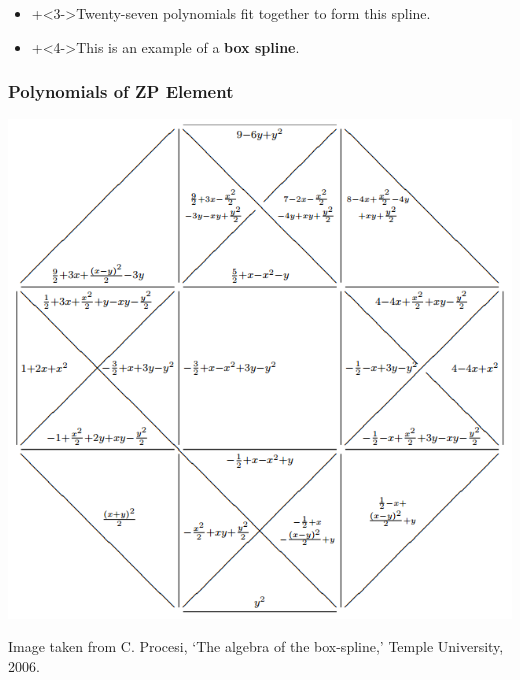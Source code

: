 \documentclass{beamer}
\theoremstyle{definition}
\theoremstyle{remark}
\begin{document}
\begin{frame}
\begin{overlayarea}{\textwidth}{40 pt}
\begin{itemize}
\item \onslide+<3->{Twenty-seven polynomials fit together to form this spline.}

\item \onslide+<4->{This is an example of a \textbf{box spline}.}
%
\end{itemize}

\end{overlayarea}

\end{frame}

\begin{frame}
\frametitle{Polynomials of ZP Element}

\begin{center}
\includegraphics[scale=.45]{ZPPolys.png}

\tiny{Image taken from C. Procesi, `The algebra of the box-spline,' Temple University, 2006.}
\end{center}

\end{frame}
\end{document}
